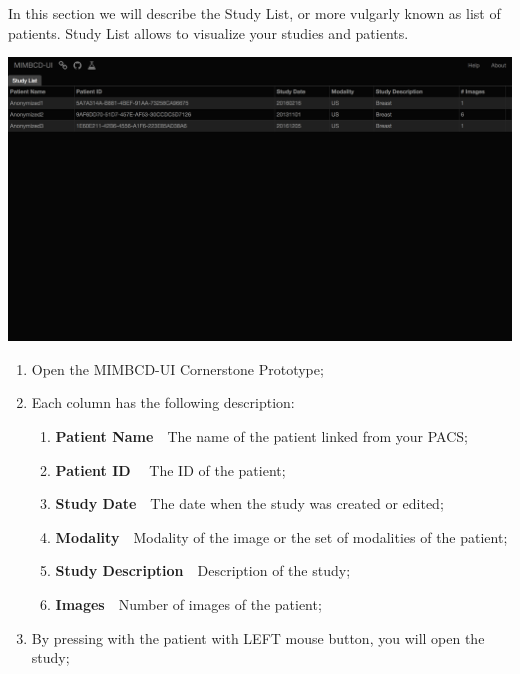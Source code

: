 \documentclass{tufte-book} %
\begin{document}
In this section we will describe the Study List, or more vulgarly known as list of patients. Study List allows to visualize your studies and patients.

\hfill

\begin{center}
\includegraphics[width=\textwidth]{graphics/study_list_base.png}
\end{center}

\hfill

\clearpage

\hfill

\begin{enumerate}
\item Open the MIMBCD-UI Cornerstone Prototype;
\item Each column has the following description:
\begin{enumerate}
\item \textbf{Patient Name}~\textendash~The name of the patient linked from your PACS;
\item \textbf{Patient ID}~\textendash~ The ID of the patient;
\item \textbf{Study Date}~\textendash~The date when the study was created or edited;
\item \textbf{Modality}~\textendash~Modality of the image or the set of modalities of the patient;
\item \textbf{Study Description}~\textendash~Description of the study;
\item \textbf{Images}~\textendash~Number of images of the patient;
\end{enumerate}
\item By pressing with the patient with LEFT mouse button, you will open the study;
\end{enumerate}
\end{document}
